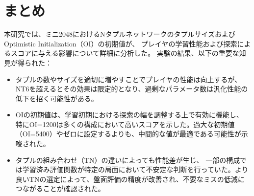 \newpage
\section{まとめ}
本研究では、ミニ2048におけるNタプルネットワークのタプルサイズおよびOptimistic Initialization（OI）の初期値が、
プレイヤの学習性能および探索によるスコアに与える影響について詳細に分析した。
実験の結果、以下の重要な知見が得られた：
\begin{itemize}
\item タプルの数やサイズを適切に増やすことでプレイヤの性能は向上するが、
NT6を超えるとその効果は限定的となり、過剰なパラメータ数は汎化性能の低下を招く可能性がある。
\item OIの初期値は、学習初期における探索の幅を調整する上で有効に機能し、
特にOI=1200は多くの構成において高いスコアを示した。過大な初期値（OI=5400）やゼロに設定するよりも、中間的な値が最適である可能性が示唆された。
\item タプルの組み合わせ（TN）の違いによっても性能差が生じ、
一部の構成では学習済み評価関数が特定の局面において不安定な判断を行っていた。より良いTNの選定によって、盤面評価の精度が改善され、不要なミスの低減につながることが確認された。
\end{itemize}
